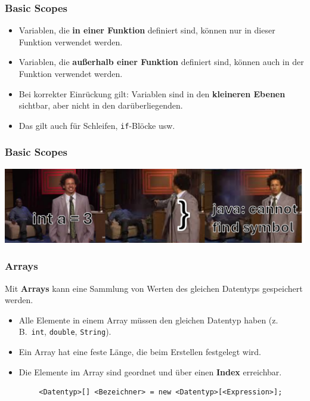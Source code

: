 \documentclass{../../presentation}
\begin{document}
\begin{frame}[fragile]
    \frametitle{Basic Scopes}
    \begin{itemize}
        \item Variablen, die \textbf{in einer Funktion} definiert sind, können nur in dieser Funktion verwendet werden.
        \item Variablen, die \textbf{außerhalb einer Funktion} definiert sind, können auch in der Funktion verwendet werden.
        \item Bei korrekter Einrückung gilt: Variablen sind in den \textbf{kleineren Ebenen} sichtbar, aber nicht in den darüberliegenden.
        \item Das gilt auch für Schleifen, \texttt{if}-Blöcke usw.
    \end{itemize}
\end{frame}

\begin{frame}[fragile]
    \frametitle{Basic Scopes}
    \includegraphics[width=1\linewidth]{img/scopes.png}
\end{frame}


\begin{frame}[fragile]
    \frametitle{Arrays}
    Mit \textbf{Arrays} kann eine Sammlung von Werten des gleichen Datentyps gespeichert werden.
    \begin{itemize}
        \item Alle Elemente in einem Array müssen den gleichen Datentyp haben (z.\,B.\ \texttt{int}, \texttt{double}, \texttt{String}).
        \item Ein Array hat eine feste Länge, die beim Erstellen festgelegt wird.
        \item Die Elemente im Array sind geordnet und über einen \textbf{Index} erreichbar.
    \end{itemize}
    \begin{verbatim}
        <Datentyp>[] <Bezeichner> = new <Datentyp>[<Expression>];
    \end{verbatim}
\end{frame}
\end{document}
